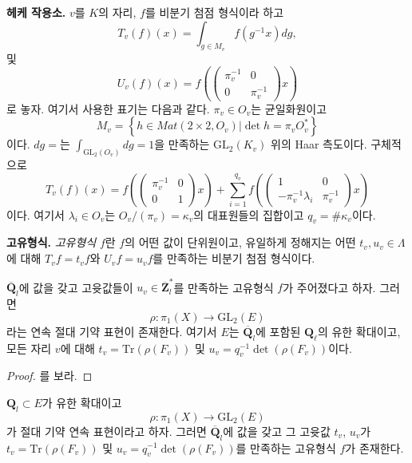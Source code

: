 \noindent
{\bf 헤케 작용소.}
$v$를 $K$의 자리, $f$를 비분기 첨점 형식이라 하고
$$
T_v(f)(x) =
\int_{g\in M_v}f(g^{-1}x)dg,
$$
및
$$
U_v(f)(x) =
f\left(
\left(
\begin{matrix}
\pi_v^{-1} & 0 \\
0 & \pi_v^{-1}
\end{matrix}
\right)x\right)
$$
로 놓자. 여기서 사용한 표기는 다음과 같다.
$\pi_v \in O_v$는 균일화원이고
$$
M_v =
\left\{
h\in Mat(2\times 2, O_v) | \det h = \pi_vO_v^*\right\}
$$
이다.
$dg = $는 $\int_{\text{GL}_2(O_v)} dg = 1$을 만족하는
$\text{GL}_2(K_v)$ 위의 Haar 측도이다. 구체적으로
$$
T_v(f)(x) =
f\left(
\left(
\begin{matrix}
\pi_v^{-1}& 0 \\
0 & 1
\end{matrix}
\right)
x\right) +
\sum_{i = 1}^{q_v}
f\left(\left(
\begin{matrix}
1 & 0 \\
-\pi_v^{-1}\lambda_i
& \pi_v^{-1}
\end{matrix}
\right) x\right)
$$
이다. 여기서 $\lambda_i\in O_v$는
$O_v/(\pi_v)=\kappa_v$의 대표원들의 집합이고
$q_v = \#\kappa_v$이다.

\medskip\noindent
{\bf 고유형식.} {\it 고유형식} $f$란 $f$의 어떤 값이 단위원이고,
유일하게 정해지는 어떤 $t_v, u_v \in \Lambda$에 대해
$T_vf = t_vf$와 $U_vf = u_vf$를 만족하는 비분기 첨점 형식이다.

\begin{theorem}
\label{theorem-drinfeld-make-rho}
$\overline{\mathbf{Q}}_l$에 값을 갖고 고윳값들이
$u_v\in \overline{\mathbf{Z}}_l^*$를 만족하는 고유형식 $f$가
주어졌다고 하자. 그러면
$$
\rho : \pi_1(X)\to \text{GL}_2(E)
$$
라는 연속 절대 기약 표현이 존재한다. 여기서 $E$는
$\overline{\mathbf{Q}}_l$에 포함된 $\mathbf{Q}_\ell$의 유한 확대이고,
모든 자리 $v$에 대해 $t_v = \text{Tr}(\rho(F_v))$ 및
$u_v = q_v^{-1}\det\left(\rho(F_v)\right)$이다.
\end{theorem}

\begin{proof}
\cite{D0}를 보라.
\end{proof}

\begin{theorem}
\label{theorem-drinfeld-make-f}
$\mathbf{Q}_l \subset E$가 유한 확대이고
$$
\rho : \pi_1(X)\to \text{GL}_2(E)
$$
가 절대 기약 연속 표현이라고 하자. 그러면
$\overline{\mathbf{Q}}_l$에 값을 갖고 그 고윳값 $t_v$, $u_v$가
$t_v = \text{Tr}(\rho(F_v))$ 및
$u_v = q_v^{-1}\det(\rho(F_v))$를 만족하는 고유형식 $f$가 존재한다.
\end{theorem}

